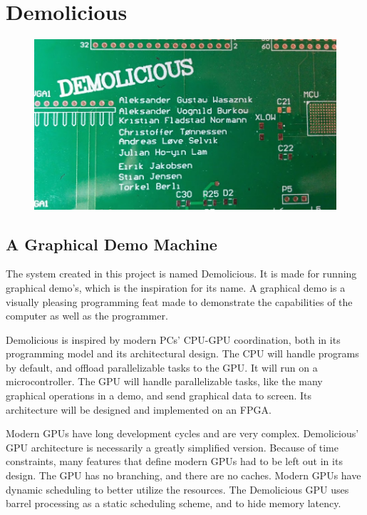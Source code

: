 \documentclass[../main/report.tex]{subfiles}
\begin{document}
\chapter{Demolicious}
\label{sec:demolicious}



\begin{figure}[htp]
\centering
\includegraphics[scale=0.24]{../introduction/assets/PCP_logo.jpg}
\end{figure}

\section{A Graphical Demo Machine}
\label{sec:demolicious-demo-machine}

The system created in this project is named Demolicious.
It is made for running graphical demo's, which is the inspiration for its name.
A graphical demo is a visually pleasing programming feat made to demonstrate the capabilities of the computer as well as the programmer.

Demolicious is inspired by modern PCs' CPU-GPU coordination, both in its programming model and its architectural design.
The CPU will handle programs by default, and offload parallelizable tasks to the GPU.
It will run on a microcontroller.
The GPU will handle parallelizable tasks, like the many graphical operations in a demo, and send graphical data to screen.
Its architecture will be designed and implemented on an FPGA.

Modern GPUs have long development cycles and are very complex.
Demolicious' GPU architecture is necessarily a greatly simplified version.
Because of time constraints, many features that define modern GPUs had to be left out in its design.
The GPU has no branching, and there are no caches.
Modern GPUs have dynamic scheduling to better utilize the resources.
The Demolicious GPU uses barrel processing as a static scheduling scheme, and to hide memory latency.
\end{document}
